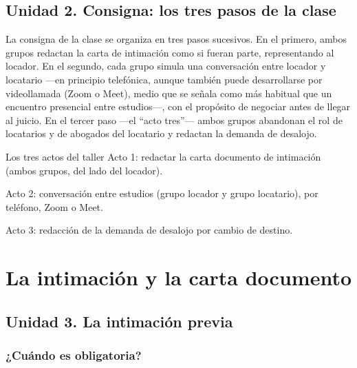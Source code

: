 \documentclass[12pt,oneside]{book}
\begin{document}
\section*{Unidad 2. Consigna: los tres pasos de la clase}

La consigna de la clase se organiza en tres pasos sucesivos. En el primero, ambos grupos redactan la carta de intimación como si fueran parte, representando al locador. En el segundo, cada grupo simula una conversación entre locador y locatario —en principio telefónica, aunque también puede desarrollarse por videollamada (Zoom o Meet), medio que se señala como más habitual que un encuentro presencial entre estudios—, con el propósito de negociar antes de llegar al juicio. En el tercer paso —el ``acto tres''— ambos grupos abandonan el rol de locatarios y de abogados del locatario y redactan la demanda de desalojo.

\begin{example}{Los tres actos del taller}
Acto 1: redactar la carta documento de intimación (ambos grupos, del lado del locador).

Acto 2: conversación entre estudios (grupo locador y grupo locatario), por teléfono, Zoom o Meet.

Acto 3: redacción de la demanda de desalojo por cambio de destino.
\end{example}

\clearpage

\chapter{La intimación y la carta documento}

\section*{Unidad 3. La intimación previa}

\subsection*{¿Cuándo es obligatoria?}
\end{document}
